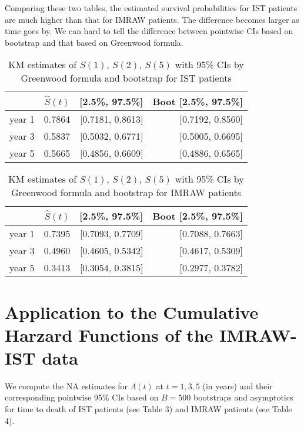\documentclass[11pt]{article}
\newcommand{\hS}{\hat{S}}
\begin{document}
Comparing these two tables, the estimated survival probabilities for IST patients
are much higher than that for IMRAW patients. The difference becomes larger as
time goes by. We can hard to tell the difference between pointwise CIs based on
bootstrap and that based on Greenwood formula.

\begin{table}[H]
\caption{KM estimates of $S(1)$, $S(2)$, $S(5)$
             with 95\% CIs by Greenwood formula and bootstrap for IST patients} 
\centering
\begin{tabular}{rrrr}
  \hline
  \hline
 & $\hS(t)$ & [2.5\%, 97.5\%] & Boot [2.5\%, 97.5\%] \\ 
  \hline
  year 1 & 0.7864 & [0.7181, 0.8613] & [0.7192, 0.8560] \\ 
  year 3 & 0.5837 & [0.5032, 0.6771] & [0.5005, 0.6695] \\ 
  year 5 & 0.5665 & [0.4856, 0.6609] & [0.4886, 0.6565] \\ 
   \hline
\end{tabular}
\end{table}

\begin{table}[H]
\caption{KM estimates of $S(1)$, $S(2)$, $S(5)$
             with 95\% CIs by Greenwood formula and bootstrap for IMRAW patients} 
\centering
\begin{tabular}{rrrr}
  \hline
  \hline
 & $\hS(t)$ & [2.5\%, 97.5\%] & Boot [2.5\%, 97.5\%] \\ 
  \hline
  year 1 & 0.7395 & [0.7093, 0.7709] & [0.7088, 0.7663] \\ 
  year 3 & 0.4960 & [0.4605, 0.5342] & [0.4617, 0.5309] \\ 
  year 5 & 0.3413 & [0.3054, 0.3815] & [0.2977, 0.3782] \\ 
   \hline
\end{tabular}
\end{table}

\section{Application to the Cumulative Harzard Functions of the IMRAW-IST data}

We compute the NA estimates for $\Lambda(t)$ at $t = 1,3,5$ (in years) and their
corresponding pointwise 95\% CIs based on $B=500$ bootstraps and asymptotics
for time to death of IST patients (see Table 3) and IMRAW
patients (see Table 4).
\end{document}
